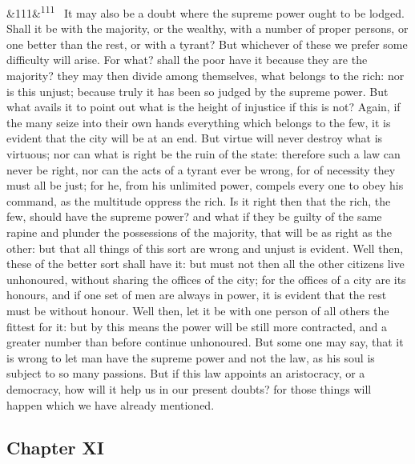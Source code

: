 \documentclass[12pt]{article}
\newcommand{\para}[1][]{\par\noindent\ifx&#1&\else\textsuperscript{\footnotesize #1}~\fi}
\begin{document}
\para[111] It may also be a doubt where the supreme power ought to be lodged. Shall it be with the majority, or the wealthy, with a number of proper persons, or one better than the rest, or with a tyrant? But whichever of these we prefer some difficulty will arise. For what? shall the poor have it because they are the majority? they may then divide among themselves, what belongs to the rich: nor is this unjust; because truly it has been so judged by the supreme power. But what avails it to point out what is the height of injustice if this is not? Again, if the many seize into their own hands everything which belongs to the few, it is evident that the city will be at an end. But virtue will never destroy what is virtuous; nor can what is right be the ruin of the state: therefore such a law can never be right, nor can the acts of a tyrant ever be wrong, for of necessity they must all be just; for he, from his unlimited power, compels every one to obey his command, as the multitude oppress the rich. Is it right then that the rich, the few, should have the supreme power? and what if they be guilty of the same rapine and plunder the possessions of the majority, that will be as right as the other: but that all things of this sort are wrong and unjust is evident. Well then, these of the better sort shall have it: but must not then all the other citizens live unhonoured, without sharing the offices of the city; for the offices of a city are its honours, and if one set of men are always in power, it is evident that the rest must be without honour. Well then, let it be with one person of all others the fittest for it: but by this means the power will be still more contracted, and a greater number than before continue unhonoured. But some one may say, that it is wrong to let man have the supreme power and not the law, as his soul is subject to so many passions. But if this law appoints an aristocracy, or a democracy, how will it help us in our present doubts? for those things will happen which we have already mentioned.

\subsection*{Chapter XI}
\end{document}
